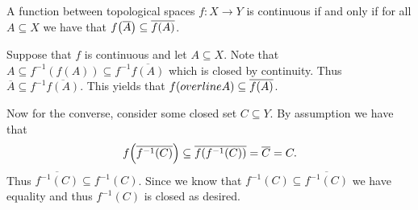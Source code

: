 \documentclass[letterpaper, 11pt, oneside]{book}
\begin{document}
\begin{prop}\label{prop: continuous_iff_im_closure_subset_closure_im}
  A function between topological spaces $f\colon X \to Y$ is continuous if and only if for all $A \subseteq X$ we have that $f\pqty{\overline{A}} \subseteq \overline{f(A)}$.
\end{prop}
\begin{pf}
  Suppose that $f$ is continuous and let $A \subseteq X$.
  Note that $A \subseteq f^{-1}(f(A)) \subseteq f^{-1}\overline{f(A)}$ which is closed by continuity.
  Thus $\overline{A} \subseteq f^{-1}\overline{f(A)}$.
  This yields that $f\pqty{overline{A}} \subseteq \overline{f(A)}$.

  Now for the converse, consider some closed set $C \subseteq Y$.
  By assumption we have that
  \[
    f\pqty{\overline{f^{-1}(C)}} \subseteq \overline{f\pqty{f^{-1}(C)}} = \overline{C} = C.
  \]
  Thus $\overline{f^{-1}(C)} \subseteq f^{-1}(C)$.
  Since we know that $f^{-1}(C) \subseteq \overline{f^{-1}(C)}$ we have equality and thus $f^{-1}(C)$ is closed as desired.
\end{pf}
\end{document}
